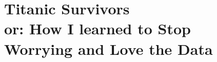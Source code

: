 \documentclass{llncs}
\begin{document}
\section{Titanic Survivors\\ \large or: How I learned to Stop Worrying and Love the Data}
\end{document}
